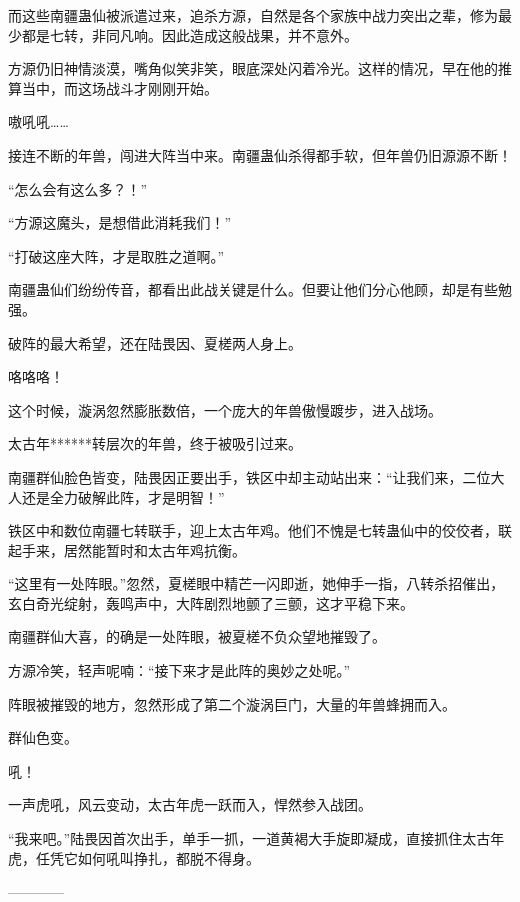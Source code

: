 \begin{this_body}
而这些南疆蛊仙被派遣过来，追杀方源，自然是各个家族中战力突出之辈，修为最少都是七转，非同凡响。因此造成这般战果，并不意外。

方源仍旧神情淡漠，嘴角似笑非笑，眼底深处闪着冷光。这样的情况，早在他的推算当中，而这场战斗才刚刚开始。

嗷吼吼……

接连不断的年兽，闯进大阵当中来。南疆蛊仙杀得都手软，但年兽仍旧源源不断！

“怎么会有这么多？！”

“方源这魔头，是想借此消耗我们！”

“打破这座大阵，才是取胜之道啊。”

南疆蛊仙们纷纷传音，都看出此战关键是什么。但要让他们分心他顾，却是有些勉强。

破阵的最大希望，还在陆畏因、夏槎两人身上。

咯咯咯！

这个时候，漩涡忽然膨胀数倍，一个庞大的年兽傲慢踱步，进入战场。

太古年******转层次的年兽，终于被吸引过来。

南疆群仙脸色皆变，陆畏因正要出手，铁区中却主动站出来：“让我们来，二位大人还是全力破解此阵，才是明智！”

铁区中和数位南疆七转联手，迎上太古年鸡。他们不愧是七转蛊仙中的佼佼者，联起手来，居然能暂时和太古年鸡抗衡。

“这里有一处阵眼。”忽然，夏槎眼中精芒一闪即逝，她伸手一指，八转杀招催出，玄白奇光绽射，轰鸣声中，大阵剧烈地颤了三颤，这才平稳下来。

南疆群仙大喜，的确是一处阵眼，被夏槎不负众望地摧毁了。

方源冷笑，轻声呢喃：“接下来才是此阵的奥妙之处呢。”

阵眼被摧毁的地方，忽然形成了第二个漩涡巨门，大量的年兽蜂拥而入。

群仙色变。

吼！

一声虎吼，风云变动，太古年虎一跃而入，悍然参入战团。

“我来吧。”陆畏因首次出手，单手一抓，一道黄褐大手旋即凝成，直接抓住太古年虎，任凭它如何吼叫挣扎，都脱不得身。

------------

\end{this_body}

